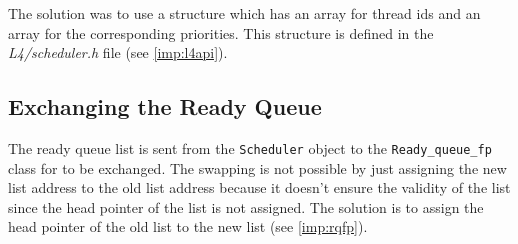 The solution was to use a structure which has an array for thread ids and an array for the corresponding priorities. This structure is defined in the \textit{L4/scheduler.h} file (see \ref{imp:l4api}).

\subsection{Exchanging the Ready Queue}
The ready queue list is sent from the \texttt{Scheduler} object to the \texttt{Ready\_queue\_fp} class for to be exchanged. The swapping is not possible by just assigning the new list address to the old list address because it doesn't ensure the validity of the list since the head pointer of the list is not assigned. The solution is to assign the head pointer of the old list to the new list (see \ref{imp:rqfp}).